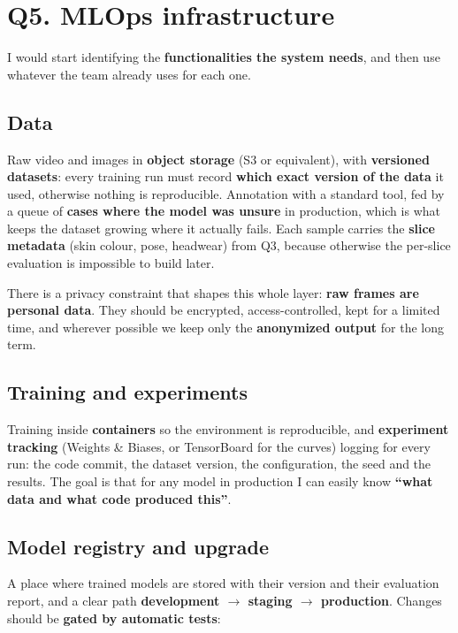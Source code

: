 \documentclass[11pt,a4paper]{article}
\begin{document}
\section*{Q5. MLOps infrastructure}

I would start identifying the \textbf{functionalities the system needs}, and
then use whatever the team already uses for each one.

\subsection*{Data}

Raw video and images in \textbf{object storage} (S3 or equivalent), with \textbf{versioned
datasets}: every training run must record \textbf{which exact version of the data} it used,
otherwise nothing is reproducible. Annotation with a standard tool, fed by a queue of
\textbf{cases where the model was unsure} in production, which is what keeps the dataset
growing where it actually fails. Each sample carries the \textbf{slice metadata} (skin colour, pose, headwear) from Q3,
because otherwise the per-slice evaluation is impossible to build later.

There is a privacy constraint that shapes this whole layer: \textbf{raw frames are personal
data}. They should be encrypted, access-controlled, kept for a limited time, and wherever
possible we keep only the \textbf{anonymized output} for the long term.

\subsection*{Training and experiments}

Training inside \textbf{containers} so the environment is reproducible, and
\textbf{experiment tracking} (Weights \& Biases, or TensorBoard for the curves) logging for
every run: the code commit, the dataset version, the configuration, the seed and the results.
The goal is that for any model in production I can easily know \textbf{``what data and what code
produced this''}.

\subsection*{Model registry and upgrade}

A place where trained models are stored with their version and their evaluation report, and a
clear path \textbf{development $\rightarrow$ staging $\rightarrow$ production}. Changes should
be \textbf{gated by automatic tests}:
\end{document}
